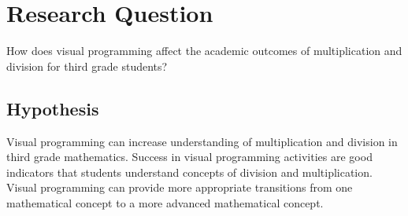 \section{Research Question}
How does visual programming affect the academic outcomes of multiplication and division for third grade students?

\subsection*{Hypothesis}
Visual programming can increase understanding of multiplication and division in third grade mathematics.
Success in visual programming activities are good indicators that students understand concepts of division and multiplication.
Visual programming can provide more appropriate transitions from one mathematical concept to a more advanced mathematical concept.
